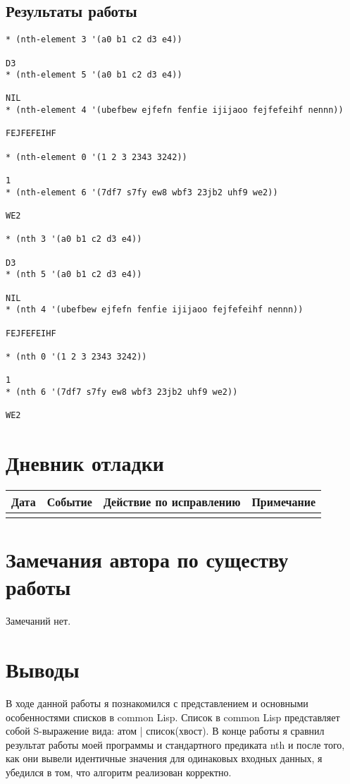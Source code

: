 \documentclass[12pt]{article}
\begin{document}
\subsection{Результаты работы}
\begin{verbatim}
* (nth-element 3 '(a0 b1 c2 d3 e4))

D3
* (nth-element 5 '(a0 b1 c2 d3 e4)) 

NIL
* (nth-element 4 '(ubefbew ejfefn fenfie ijijaoo fejfefeihf nennn))

FEJFEFEIHF

* (nth-element 0 '(1 2 3 2343 3242))

1
* (nth-element 6 '(7df7 s7fy ew8 wbf3 23jb2 uhf9 we2))

WE2

* (nth 3 '(a0 b1 c2 d3 e4))

D3
* (nth 5 '(a0 b1 c2 d3 e4))

NIL
* (nth 4 '(ubefbew ejfefn fenfie ijijaoo fejfefeihf nennn))

FEJFEFEIHF

* (nth 0 '(1 2 3 2343 3242))

1
* (nth 6 '(7df7 s7fy ew8 wbf3 23jb2 uhf9 we2))

WE2
\end{verbatim}

\section{Дневник отладки}
\begin{tabular}{|p{50pt}|p{130pt}|p{130pt}|p{70pt}|}
\hline
Дата & Событие & Действие по исправлению & Примечание \\ \hline
& & &\\
\hline
\end{tabular}

\section{Замечания автора по существу работы}
Замечаний нет.

\section{Выводы}
В ходе данной работы я познакомился с представлением и основными особенностями списков в common Lisp. Список в common Lisp представляет собой S-выражение вида: атом | список(хвост). В конце работы я сравнил результат работы моей программы и стандартного предиката nth и после того, как они вывели идентичные значения для одинаковых входных данных, я убедился в том, что алгоритм реализован корректно.
\end{document}
